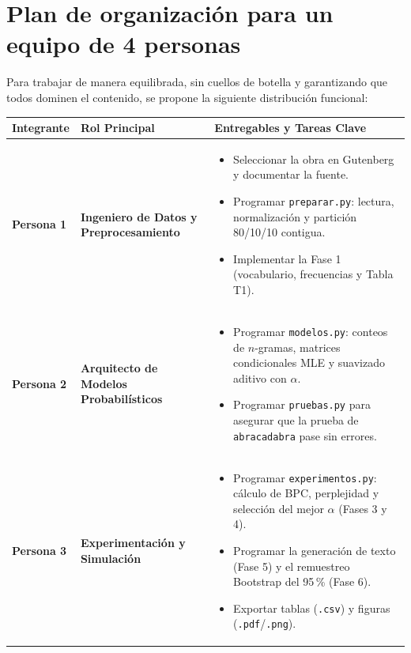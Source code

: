 \documentclass[11pt,letterpaper]{article}
\begin{document}
\section{Plan de organización para un equipo de 4 personas}

Para trabajar de manera equilibrada, sin cuellos de botella y garantizando que todos dominen el contenido, se propone la siguiente distribución funcional:

\begin{table}[H]
\centering
\small
\begin{tabularx}{\textwidth}{l p{3.8cm} X}
\toprule
\textbf{Integrante} & \textbf{Rol Principal} & \textbf{Entregables y Tareas Clave} \\
\midrule
\textbf{Persona 1} & \textbf{Ingeniero de Datos y Preprocesamiento} & 
\begin{itemize}[leftmargin=*, nosep]
    \item Seleccionar la obra en Gutenberg y documentar la fuente.
    \item Programar \texttt{preparar.py}: lectura, normalización y partición 80/10/10 contigua.
    \item Implementar la Fase 1 (vocabulario, frecuencias y Tabla T1).
\end{itemize} \\
\addlinespace[3pt]
\textbf{Persona 2} & \textbf{Arquitecto de Modelos Probabilísticos} & 
\begin{itemize}[leftmargin=*, nosep]
    \item Programar \texttt{modelos.py}: conteos de $n$-gramas, matrices condicionales MLE y suavizado aditivo con $\alpha$.
    \item Programar \texttt{pruebas.py} para asegurar que la prueba de \texttt{abracadabra} pase sin errores.
\end{itemize} \\
\addlinespace[3pt]
\textbf{Persona 3} & \textbf{Experimentación y Simulación} & 
\begin{itemize}[leftmargin=*, nosep]
    \item Programar \texttt{experimentos.py}: cálculo de BPC, perplejidad y selección del mejor $\alpha$ (Fases 3 y 4).
    \item Programar la generación de texto (Fase 5) y el remuestreo Bootstrap del 95\,\% (Fase 6).
    \item Exportar tablas (\texttt{.csv}) y figuras (\texttt{.pdf}/\texttt{.png}).
\end{itemize} \\

\end{tabularx}
\end{table}
\end{document}
